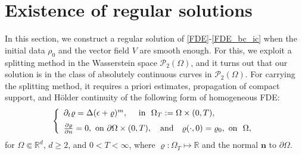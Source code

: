 \documentclass{amsart}
\numberwithin{equation}{section}
\newcommand{\bbr}{{ \mathbb{R}  }}
\begin{document}
\section{Existence of regular solutions }\label{splitting method}

In this section, we construct a regular solution of \eqref{FDE}-\eqref{FDE_bc_ic} when the initial data $\rho_0$ and the vector field $V$ are smooth enough.
For this, we exploit a splitting method in the Wasserstein space $\mathcal{P}_2(\Omega)$, and it turns out that our solution is in the class of absolutely continuous curves in $\mathcal{P}_2(\Omega)$.
For carrying the splitting method, it requires a priori estimates, propagation of compact support, and H\"{o}lder continuity of the following form of homogeneous FDE:
\begin{equation}\label{H-FDE}
  \left\{
  \begin{array}{ll}
  \partial_t \varrho =   \Delta (\epsilon +\varrho)^m,  \quad \text{ in } \ \Omega_{T} := \Omega \times (0, T),  \vspace{2mm}\\
  \frac{\partial \varrho}{\partial \textbf{n}} = 0,  \text{ on } \partial \Omega \times (0, T), 
  \quad \text{and} \quad 
  \varrho(\cdot,0)=\varrho_0,  \text{ on } \ \Omega,
  \end{array}
  \right.
\end{equation}
for $\Omega \Subset \bbr^d$, $d\geq 2$, and $0 <T < \infty$, where $\varrho:\Omega_T\mapsto \bbr$ and the normal $\textbf{n}$ to $\partial \Omega$.
\end{document}

